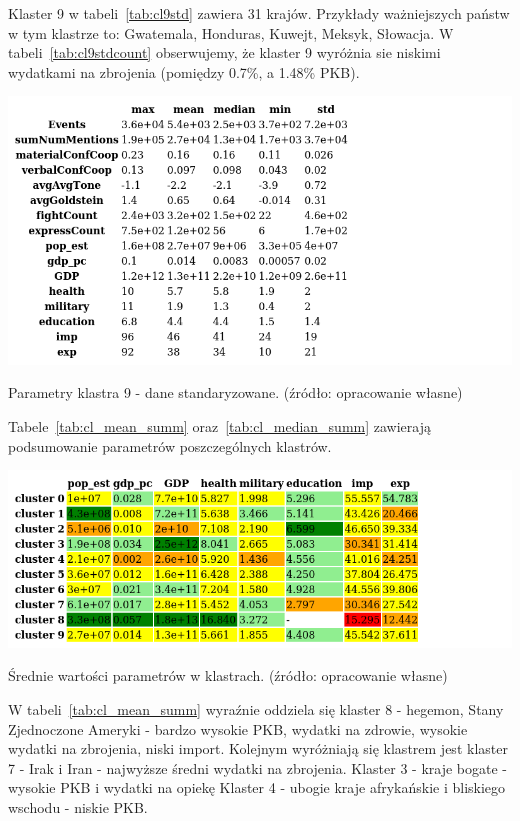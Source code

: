 \documentclass[11pt]{report}
\begin{document}
    Klaster 9 w tabeli~\ref{tab:cl9std} zawiera 31 krajów.
    Przykłady ważniejszych państw w tym klastrze to: Gwatemala, Honduras, Kuwejt, Meksyk, Słowacja.
    W tabeli~\ref{tab:cl9stdcount} obserwujemy, że klaster 9 wyróżnia sie niskimi wydatkami na zbrojenia (pomiędzy 0.7\%, a 1.48\% PKB).

    \begin{table}[!htp]
        \centering
        \includegraphics[width=\linewidth]{tables/CLUST/desc/clust9std_desc.png}
        \caption{Parametry klastra 9 - dane standaryzowane. (źródło: opracowanie własne)}
        \label{tab:cl9std_desc}
    \end{table}

    Tabele~\ref{tab:cl_mean_summ} oraz~\ref{tab:cl_median_summ} zawierają podsumowanie parametrów poszczególnych klastrów.

    \begin{table}[!htp]
        \centering
        \includegraphics[width=\linewidth]{tables/CLUST/desc/cluster_mean_summary.png}
        \caption{Średnie wartości parametrów w klastrach. (źródło: opracowanie własne)}
        \label{tab:cl_mean_summ}
    \end{table}

    W tabeli~\ref{tab:cl_mean_summ} wyraźnie oddziela się klaster 8 - hegemon, Stany Zjednoczone Ameryki - bardzo wysokie PKB, wydatki na zdrowie, wysokie wydatki na zbrojenia, niski import.
    Kolejnym wyróżniają się klastrem jest klaster 7 - Irak i Iran - najwyższe średni wydatki na zbrojenia.
    Klaster 3 - kraje bogate - wysokie PKB i wydatki na opiekę
    Klaster 4 - ubogie kraje afrykańskie i bliskiego wschodu - niskie PKB.
\end{document}
